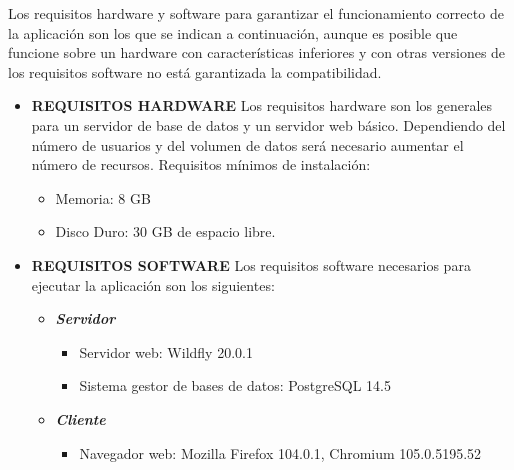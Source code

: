 Los requisitos hardware y software para garantizar el funcionamiento correcto de
la aplicación son los que se indican a continuación, aunque es posible que funcione
sobre un hardware con características inferiores y con otras versiones de los requisitos
software no está garantizada la compatibilidad.
\begin{itemize}
\item \textbf{REQUISITOS HARDWARE}\newline
Los requisitos hardware son los generales para un servidor de base de datos y un servidor web básico. Dependiendo del número de usuarios y del volumen de datos será necesario aumentar el número de recursos.
Requisitos mínimos de instalación:
	\begin{itemize}
	\item Memoria: 8 GB
	\item Disco Duro: 30 GB de espacio libre.
	\end{itemize} 

\item \textbf{REQUISITOS SOFTWARE}\newline
Los requisitos software necesarios para ejecutar la aplicación son los siguientes:
	\begin{itemize}
		\item \textit{\textbf{Servidor}}
		\begin{itemize}
			\item Servidor web: Wildfly 20.0.1
			\item Sistema gestor de bases de datos: PostgreSQL 14.5
		\end{itemize}

		\item \textit{\textbf{Cliente}}
		\begin{itemize}
			\item Navegador web: Mozilla Firefox 104.0.1, Chromium 105.0.5195.52
		\end{itemize}
	\end{itemize}
\end{itemize}





